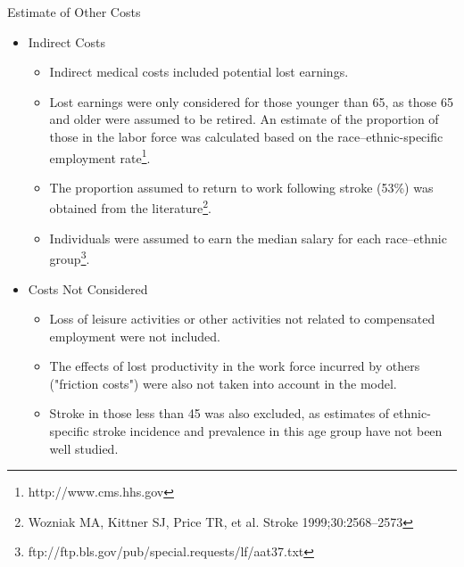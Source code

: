 \documentclass[10pt, xcolor=table]{beamer}
\begin{document}
\begin{frame}{Estimate of Other Costs}
	\begin{itemize}
		\item Indirect Costs
		\begin{itemize}
			\scriptsize
			\item Indirect medical costs included potential lost earnings.  
			\item Lost earnings were only considered for those younger than 65, as those 65 and older were assumed to be retired. An estimate of the proportion of those in the labor force was calculated based on the race–ethnic-specific employment rate\footnote{http://www.cms.hhs.gov}. 
			\item The proportion assumed to return to work following stroke (53\%) was obtained from the literature\footnote{Wozniak MA, Kittner SJ, Price TR, et al. Stroke 1999;30:2568–2573}.
			\item Individuals were assumed to earn the median salary for each race–ethnic group\footnote{ftp://ftp.bls.gov/pub/special.requests/lf/aat37.txt}.
		\end{itemize}
		\item Costs Not Considered
		\begin{itemize}
			\scriptsize
			\item Loss of leisure activities or other activities not related to compensated employment were not included. 
			\item The effects of lost productivity in the work force incurred by others ("friction costs") were also not taken into account in the model.
			\item  Stroke in those less than 45 was also excluded, as estimates of ethnic-specific stroke incidence and prevalence in this age group have not been well studied.
		\end{itemize}
	\end{itemize}
\end{frame}
\end{document}
